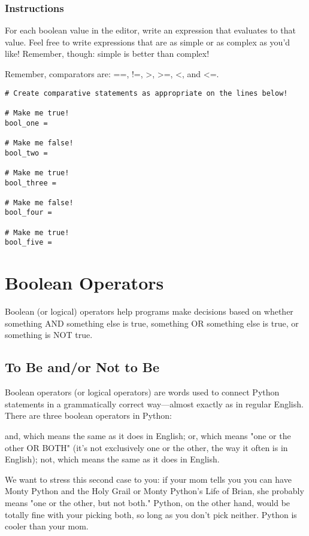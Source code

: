 \documentclass[12pt,a4paper,final,twoside,onecolumn,titlepage]{book}
\begin{document}
\subsubsection{Instructions}

For each boolean value in the editor, write an expression that evaluates to that value. Feel free to write expressions that are as simple or as complex as you'd like! Remember, though: simple is better than complex!

Remember, comparators are: ==, !=, >, >=, <, and <=.

\begin{lstlisting}
# Create comparative statements as appropriate on the lines below!

# Make me true!
bool_one = 

# Make me false!
bool_two = 

# Make me true!
bool_three = 

# Make me false!
bool_four = 

# Make me true!
bool_five = 
\end{lstlisting}

\section{Boolean Operators}
Boolean (or logical) operators help programs make decisions based on whether something AND something else is true, something OR something else is true, or something is NOT true.

\subsection{To Be and/or Not to Be}

Boolean operators (or logical operators) are words used to connect Python statements in a grammatically correct way—almost exactly as in regular English. There are three boolean operators in Python:

    and, which means the same as it does in English;
    or, which means "one or the other OR BOTH" (it's not exclusively one or the other, the way it often is in English);
    not, which means the same as it does in English.

We want to stress this second case to you: if your mom tells you you can have Monty Python and the Holy Grail or Monty Python's Life of Brian, she probably means "one or the other, but not both." Python, on the other hand, would be totally fine with your picking both, so long as you don't pick neither. Python is cooler than your mom.
\end{document}

